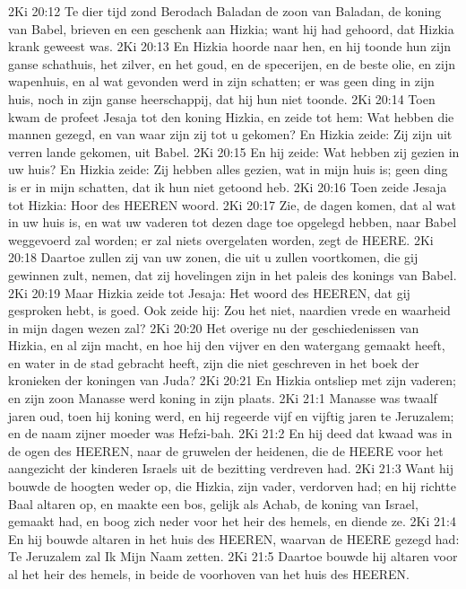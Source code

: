2Ki 20:12  Te dier tijd zond Berodach Baladan de zoon van Baladan, de koning van Babel, brieven en een geschenk aan Hizkia; want hij had gehoord, dat Hizkia krank geweest was.
2Ki 20:13  En Hizkia hoorde naar hen, en hij toonde hun zijn ganse schathuis, het zilver, en het goud, en de specerijen, en de beste olie, en zijn wapenhuis, en al wat gevonden werd in zijn schatten; er was geen ding in zijn huis, noch in zijn ganse heerschappij, dat hij hun niet toonde.
2Ki 20:14  Toen kwam de profeet Jesaja tot den koning Hizkia, en zeide tot hem: Wat hebben die mannen gezegd, en van waar zijn zij tot u gekomen? En Hizkia zeide: Zij zijn uit verren lande gekomen, uit Babel.
2Ki 20:15  En hij zeide: Wat hebben zij gezien in uw huis? En Hizkia zeide: Zij hebben alles gezien, wat in mijn huis is; geen ding is er in mijn schatten, dat ik hun niet getoond heb.
2Ki 20:16  Toen zeide Jesaja tot Hizkia: Hoor des HEEREN woord.
2Ki 20:17  Zie, de dagen komen, dat al wat in uw huis is, en wat uw vaderen tot dezen dage toe opgelegd hebben, naar Babel weggevoerd zal worden; er zal niets overgelaten worden, zegt de HEERE.
2Ki 20:18  Daartoe zullen zij van uw zonen, die uit u zullen voortkomen, die gij gewinnen zult, nemen, dat zij hovelingen zijn in het paleis des konings van Babel.
2Ki 20:19  Maar Hizkia zeide tot Jesaja: Het woord des HEEREN, dat gij gesproken hebt, is goed. Ook zeide hij: Zou het niet, naardien vrede en waarheid in mijn dagen wezen zal?
2Ki 20:20  Het overige nu der geschiedenissen van Hizkia, en al zijn macht, en hoe hij den vijver en den watergang gemaakt heeft, en water in de stad gebracht heeft, zijn die niet geschreven in het boek der kronieken der koningen van Juda?
2Ki 20:21  En Hizkia ontsliep met zijn vaderen; en zijn zoon Manasse werd koning in zijn plaats.
2Ki 21:1  Manasse was twaalf jaren oud, toen hij koning werd, en hij regeerde vijf en vijftig jaren te Jeruzalem; en de naam zijner moeder was Hefzi-bah.
2Ki 21:2  En hij deed dat kwaad was in de ogen des HEEREN, naar de gruwelen der heidenen, die de HEERE voor het aangezicht der kinderen Israels uit de bezitting verdreven had.
2Ki 21:3  Want hij bouwde de hoogten weder op, die Hizkia, zijn vader, verdorven had; en hij richtte Baal altaren op, en maakte een bos, gelijk als Achab, de koning van Israel, gemaakt had, en boog zich neder voor het heir des hemels, en diende ze.
2Ki 21:4  En hij bouwde altaren in het huis des HEEREN, waarvan de HEERE gezegd had: Te Jeruzalem zal Ik Mijn Naam zetten.
2Ki 21:5  Daartoe bouwde hij altaren voor al het heir des hemels, in beide de voorhoven van het huis des HEEREN.
